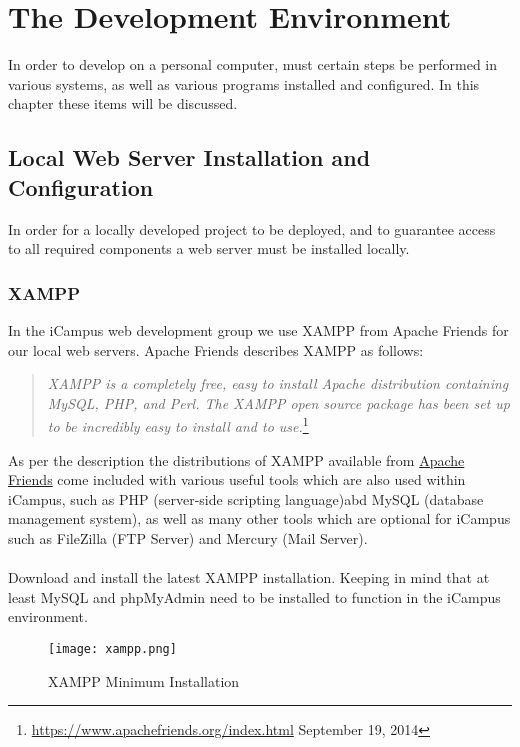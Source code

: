 \chapter{The Development Environment}

In order to develop on a personal computer, must certain steps be performed in various systems, as well as various programs installed and configured. In this chapter these items will be discussed.

\section{Local Web Server Installation and Configuration}

In order for a locally developed project to be deployed, and to guarantee access to all required components a web server must be installed locally. 

\subsection{XAMPP}

In the iCampus web development group we use XAMPP from Apache Friends for our local web servers. Apache Friends describes XAMPP as follows:

\begin{quote}
	\textit{XAMPP is a completely free, easy to install Apache distribution containing MySQL, PHP, and Perl. The XAMPP open source package has been set up to be incredibly easy to install and to use.}\footnote{\url{https://www.apachefriends.org/index.html} September 19, 2014}
\end{quote}

\noindent
As per the description the distributions of XAMPP available from \href{https://www.apachefriends.org/index.html}{Apache Friends} come included with various useful tools which are also used within iCampus, such as PHP (server-side scripting language)abd MySQL (database management system), as well as many other tools which are optional for iCampus such as FileZilla (FTP Server) and Mercury (Mail Server).\\
\\
Download and install the latest XAMPP installation. Keeping in mind that at least MySQL and phpMyAdmin need to be installed to function in the iCampus environment.

\begin{figure}[h] 
	\centering
	\texttt{[image: xampp.png]}
	\caption{XAMPP Minimum Installation}
\end{figure}

